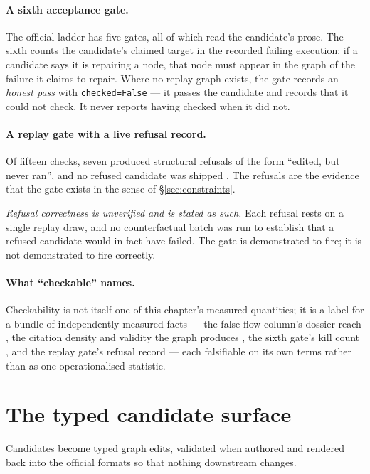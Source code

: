 \paragraph{A sixth acceptance gate.} The official ladder has five gates,
all of which read the candidate's prose. The sixth counts the candidate's
claimed target in the recorded failing execution: if a candidate says it is
repairing a node, that node must appear in the graph of the failure it
claims to repair. Where no replay graph exists, the gate records an
\emph{honest pass} with \texttt{checked=False} --- it passes the candidate
and records that it could not check. It never reports having checked when
it did not.

\paragraph{A replay gate with a live refusal record.} Of fifteen checks,
seven produced structural refusals of the form ``edited, but never ran'',
and no refused candidate was shipped . The refusals are the evidence
that the gate exists in the sense of \S\ref{sec:constraints}.

\emph{Refusal correctness is unverified and is stated as such.} Each
refusal rests on a single replay draw, and no counterfactual batch was run
to establish that a refused candidate would in fact have failed. The gate
is demonstrated to fire; it is not demonstrated to fire correctly.

\paragraph{What ``checkable'' names.} Checkability is not itself one of
this chapter's measured quantities; it is a label for a bundle of
independently measured facts --- the false-flow column's dossier reach
, the citation density and validity the graph produces , the
sixth gate's kill count , and the replay gate's refusal record
 --- each falsifiable on its own terms rather than as one
operationalised statistic.

\section{The typed candidate surface}
\label{sec:candidate-surface}

Candidates become typed graph edits, validated when authored and rendered
back into the official formats so that nothing downstream changes.

